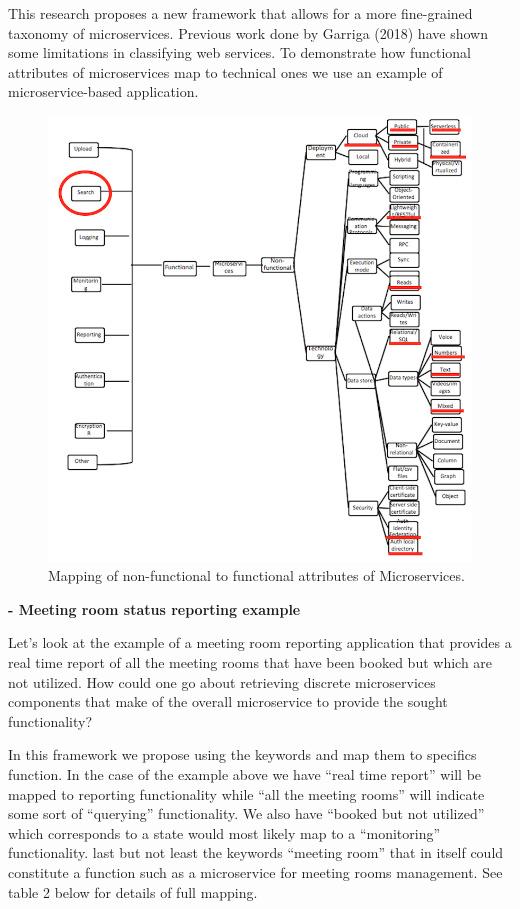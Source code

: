 \documentclass{article}
\begin{document}
This research proposes a new framework that allows for a more fine-grained taxonomy of microservices. Previous work done by Garriga (2018) have shown some limitations in classifying web services. To demonstrate how functional attributes of microservices map to technical ones we use an example of microservice-based application. 

\begin{figure}[h!]
\includegraphics{func2techmapping.png}
\caption{Mapping of non-functional to functional attributes of Microservices.}
\end{figure}


\textbf{- Meeting room status reporting example}

Let's look at the example of a meeting room reporting application that provides a real time report of all the meeting rooms that have been booked but which are not utilized. How could one go about retrieving discrete microservices components that make of the overall microservice to provide the sought functionality?

In this framework we propose using the keywords and map them to specifics function. In the case of the example above we have “real time report” will be mapped to reporting functionality while “all the meeting rooms” will indicate some sort of “querying” functionality. We also have “booked but not utilized” which corresponds to a state would most likely map to a “monitoring” functionality. last but not least the keywords “meeting room” that in itself could constitute a function such as a microservice for meeting rooms management. See table 2 below for details of full mapping.
\end{document}
